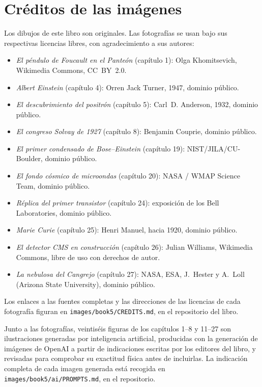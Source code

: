 \chapter*{Créditos de las imágenes}

Los dibujos de este libro son originales. Las fotografías se usan bajo
sus respectivas licencias libres, con agradecimiento a sus autores:

\begin{itemize}
  \item \emph{El péndulo de Foucault en el Panteón} (capítulo 1):
        Olga Khomitsevich, Wikimedia Commons, CC~BY~2.0.
  \item \emph{Albert Einstein} (capítulo 4): Orren Jack Turner,
        1947, dominio público.
  \item \emph{El descubrimiento del positrón} (capítulo 5): Carl~D.
        Anderson, 1932, dominio público.
  \item \emph{El congreso Solvay de 1927} (capítulo 8): Benjamin
        Couprie, dominio público.
  \item \emph{El primer condensado de Bose--Einstein}
        (capítulo 19): NIST/JILA/CU-Boulder, dominio público.
  \item \emph{El fondo cósmico de microondas} (capítulo 20):
        NASA / WMAP Science Team, dominio público.
  \item \emph{Réplica del primer transistor} (capítulo 24):
        exposición de los Bell Laboratories, dominio público.
  \item \emph{Marie Curie} (capítulo 25): Henri Manuel, hacia 1920,
        dominio público.
  \item \emph{El detector CMS en construcción} (capítulo 26):
        Julian Williams, Wikimedia Commons, libre de uso con derechos
        de autor.
  \item \emph{La nebulosa del Cangrejo} (capítulo 27): NASA, ESA,
        J.~Hester y A.~Loll (Arizona State University), dominio
        público.
\end{itemize}

Los enlaces a las fuentes completas y las direcciones de las licencias
de cada fotografía figuran en \texttt{images/book5/CREDITS.md}, en el
repositorio del libro.

\bigskip
Junto a las fotografías, veintiséis figuras de los capítulos 1--8 y
11--27 son ilustraciones generadas por inteligencia artificial,
producidas con la generación de imágenes de OpenAI a partir de
indicaciones escritas por los editores del libro, y revisadas para
comprobar su exactitud física antes de incluirlas. La indicación
completa de cada imagen generada está recogida en
\texttt{images/book5/ai/PROMPTS.md}, en el repositorio.
\clearpage

